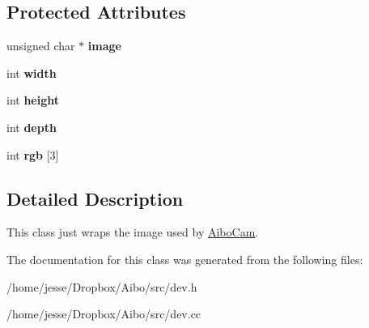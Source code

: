 \subsection*{Protected Attributes}
\begin{DoxyCompactItemize}
\item 
\hypertarget{classdev_a8e333c6cddc88bf779860ea4a3b6520e}{
unsigned char $\ast$ {\bfseries image}}
\label{classdev_a8e333c6cddc88bf779860ea4a3b6520e}

\item 
\hypertarget{classdev_a11d029d54d3705815b303480e6afa550}{
int {\bfseries width}}
\label{classdev_a11d029d54d3705815b303480e6afa550}

\item 
\hypertarget{classdev_a02cfa33ffda59395bd35f7981be4549d}{
int {\bfseries height}}
\label{classdev_a02cfa33ffda59395bd35f7981be4549d}

\item 
\hypertarget{classdev_a917c7f62c2c4c07ab51c2c9b00a9f587}{
int {\bfseries depth}}
\label{classdev_a917c7f62c2c4c07ab51c2c9b00a9f587}

\item 
\hypertarget{classdev_a5292d1ac643cc0fa3413406b5600142e}{
int {\bfseries rgb} \mbox{[}3\mbox{]}}
\label{classdev_a5292d1ac643cc0fa3413406b5600142e}

\end{DoxyCompactItemize}


\subsection{Detailed Description}
This class just wraps the image used by \hyperlink{classAiboCam}{AiboCam}. 

The documentation for this class was generated from the following files:\begin{DoxyCompactItemize}
\item 
/home/jesse/Dropbox/Aibo/src/dev.h\item 
/home/jesse/Dropbox/Aibo/src/dev.cc\end{DoxyCompactItemize}
